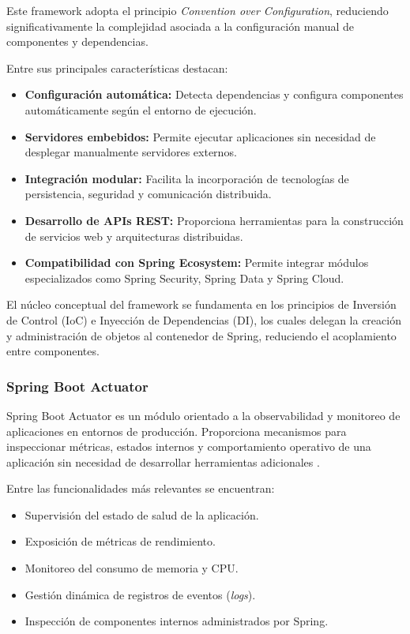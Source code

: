 \documentclass[12pt, oneside, letterpaper]{book}
\begin{document}
Este framework adopta el principio \textit{Convention over Configuration}, reduciendo significativamente la complejidad asociada a la configuración manual de componentes y dependencias.

Entre sus principales características destacan:

\begin{itemize}
\item \textbf{Configuración automática:} Detecta dependencias y configura componentes automáticamente según el entorno de ejecución.

\item \textbf{Servidores embebidos:} Permite ejecutar aplicaciones sin necesidad de desplegar manualmente servidores externos.

\item \textbf{Integración modular:} Facilita la incorporación de tecnologías de persistencia, seguridad y comunicación distribuida.

\item \textbf{Desarrollo de APIs REST:} Proporciona herramientas para la construcción de servicios web y arquitecturas distribuidas.

\item \textbf{Compatibilidad con Spring Ecosystem:} Permite integrar módulos especializados como Spring Security, Spring Data y Spring Cloud.
\end{itemize}

El núcleo conceptual del framework se fundamenta en los principios de Inversión de Control (IoC) e Inyección de Dependencias (DI), los cuales delegan la creación y administración de objetos al contenedor de Spring, reduciendo el acoplamiento entre componentes.

\subsubsection{Spring Boot Actuator}

Spring Boot Actuator es un módulo orientado a la observabilidad y monitoreo de aplicaciones en entornos de producción. Proporciona mecanismos para inspeccionar métricas, estados internos y comportamiento operativo de una aplicación sin necesidad de desarrollar herramientas adicionales \cite{51}.

Entre las funcionalidades más relevantes se encuentran:

\begin{itemize}
\item Supervisión del estado de salud de la aplicación.
\item Exposición de métricas de rendimiento.
\item Monitoreo del consumo de memoria y CPU.
\item Gestión dinámica de registros de eventos (\textit{logs}).
\item Inspección de componentes internos administrados por Spring.
\end{itemize}
\end{document}
